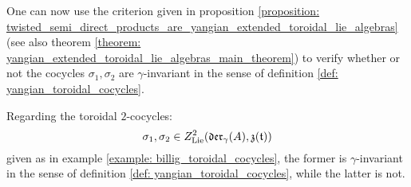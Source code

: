         One can now use the criterion given in proposition \ref{proposition: twisted_semi_direct_products_are_yangian_extended_toroidal_lie_algebras} (see also theorem \ref{theorem: yangian_extended_toroidal_lie_algebras_main_theorem}) to verify whether or not the cocycles $\sigma_1, \sigma_2$ are $\gamma$-invariant in the sense of definition \ref{def: yangian_toroidal_cocycles}.
        \begin{proposition} \label{prop: invariance_of_billig_toroidal_cocycles}
            Regarding the toroidal $2$-cocycles:
                $$\sigma_1, \sigma_2 \in Z^2_{\mathrm{Lie}}(\mathfrak{der}_{\gamma}(A), \mathfrak{z}(\mathfrak{t}))$$
            given as in example \ref{example: billig_toroidal_cocycles}, the former is $\gamma$-invariant in the sense of definition \ref{def: yangian_toroidal_cocycles}, while the latter is not.
        \end{proposition}
